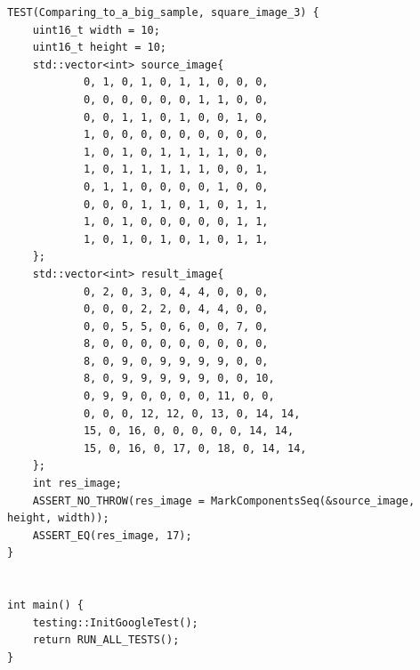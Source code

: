 \documentclass{report}
\begin{document}
\begin{lstlisting}
TEST(Comparing_to_a_big_sample, square_image_3) {
    uint16_t width = 10;
    uint16_t height = 10;
    std::vector<int> source_image{
            0, 1, 0, 1, 0, 1, 1, 0, 0, 0,
            0, 0, 0, 0, 0, 0, 1, 1, 0, 0,
            0, 0, 1, 1, 0, 1, 0, 0, 1, 0,
            1, 0, 0, 0, 0, 0, 0, 0, 0, 0,
            1, 0, 1, 0, 1, 1, 1, 1, 0, 0,
            1, 0, 1, 1, 1, 1, 1, 0, 0, 1,
            0, 1, 1, 0, 0, 0, 0, 1, 0, 0,
            0, 0, 0, 1, 1, 0, 1, 0, 1, 1,
            1, 0, 1, 0, 0, 0, 0, 0, 1, 1,
            1, 0, 1, 0, 1, 0, 1, 0, 1, 1,
    };
    std::vector<int> result_image{
            0, 2, 0, 3, 0, 4, 4, 0, 0, 0,
            0, 0, 0, 2, 2, 0, 4, 4, 0, 0,
            0, 0, 5, 5, 0, 6, 0, 0, 7, 0,
            8, 0, 0, 0, 0, 0, 0, 0, 0, 0,
            8, 0, 9, 0, 9, 9, 9, 9, 0, 0,
            8, 0, 9, 9, 9, 9, 9, 0, 0, 10,
            0, 9, 9, 0, 0, 0, 0, 11, 0, 0,
            0, 0, 0, 12, 12, 0, 13, 0, 14, 14,
            15, 0, 16, 0, 0, 0, 0, 0, 14, 14,
            15, 0, 16, 0, 17, 0, 18, 0, 14, 14,
    };
    int res_image;
    ASSERT_NO_THROW(res_image = MarkComponentsSeq(&source_image, height, width));
    ASSERT_EQ(res_image, 17);
}


int main() {
    testing::InitGoogleTest();
    return RUN_ALL_TESTS();
}


\end{lstlisting}
\end{document}
